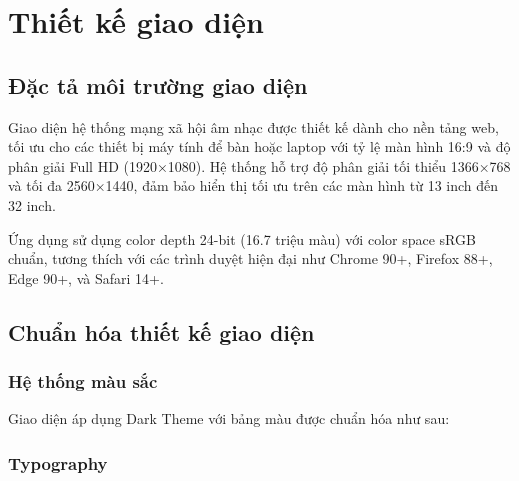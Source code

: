 \section{Thiết kế giao diện}

\subsection{Đặc tả môi trường giao diện}

Giao diện hệ thống mạng xã hội âm nhạc được thiết kế dành cho nền tảng web, tối ưu cho các thiết bị máy tính để bàn hoặc laptop với tỷ lệ màn hình 16:9 và độ phân giải Full HD (1920×1080). Hệ thống hỗ trợ độ phân giải tối thiểu 1366×768 và tối đa 2560×1440, đảm bảo hiển thị tối ưu trên các màn hình từ 13 inch đến 32 inch.

Ứng dụng sử dụng color depth 24-bit (16.7 triệu màu) với color space sRGB chuẩn, tương thích với các trình duyệt hiện đại như Chrome 90+, Firefox 88+, Edge 90+, và Safari 14+.

\subsection{Chuẩn hóa thiết kế giao diện}

\subsubsection{Hệ thống màu sắc}

Giao diện áp dụng Dark Theme với bảng màu được chuẩn hóa như sau:

\subsubsection{Typography}

